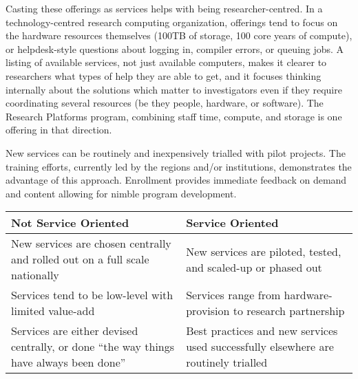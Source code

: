 \documentclass[11pt, letterpaper, twoside]{article}
\begin{document}
Casting these offerings as services helps with being researcher-centred.
In a technology-centred research computing organization, offerings tend
to focus on the hardware resources themselves (100TB of storage, 100
core years of compute), or helpdesk-style questions about logging in,
compiler errors, or queuing jobs. A listing of available services, not
just available computers, makes it clearer to researchers what types of
help they are able to get, and it focuses thinking internally about the
solutions which matter to investigators even if they require
coordinating several resources (be they people, hardware, or software).
The Research Platforms program, combining staff time, compute, and
storage is one offering in that direction.


New services can be routinely and inexpensively trialled with pilot
projects.  The training efforts, currently led by the regions and/or
institutions, demonstrates the advantage of this approach. Enrollment
provides immediate feedback on demand and content allowing for nimble
program development.

\begin{table}[ht]
\centering
\small {\sffamily
{}
\begin{tabular}{P{2.5in}|P{2.5in}}
\textcolor{cdaRed}{\textbf{Not Service Oriented}} & \textcolor{cdaRed}{\textbf{Service Oriented}} \\
\hline \hline 
New services are chosen centrally and rolled out on a full scale nationally & New services are piloted, tested, and scaled-up or phased out\\
Services tend to be low-level with limited value-add & Services range from hardware-provision to research partnership\\
Services are either devised centrally, or done \enquote{the way things have always been done} & Best practices and new services used successfully elsewhere are routinely trialled \\
\hline
\end{tabular}
}
\end{table}

\end{document}

